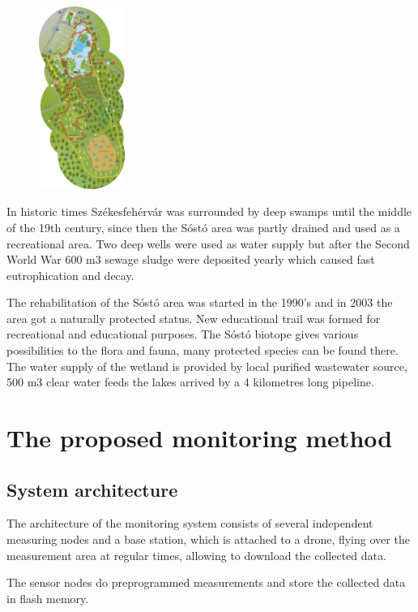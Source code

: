 \documentclass[conference]{IEEEtran}
\begin{document}
\begin{figure}[htbp]
	\centering
	\includegraphics[width=0.25\textwidth]{fig/map1.png}
  \caption{}
	\label{fig-map1}
\end{figure}

In historic times Székesfehérvár was surrounded by deep swamps until the middle
of the 19th century, since then the Sóstó area was partly drained and used as a
recreational area. Two deep wells were used as water supply but after the
Second World War 600 m3 sewage sludge were deposited yearly which caused fast
eutrophication and decay.

The rehabilitation of the Sóstó area was started in the 1990’s and in 2003 the
area got a naturally protected status. New educational trail was formed for
recreational and educational purposes. The Sóstó biotope gives various
possibilities to the flora and fauna, many protected species can be found
there. The water supply of the wetland is provided by local purified wastewater
source, 500 m3 clear water feeds the lakes arrived by a 4 kilometres long
pipeline.


\section{The proposed monitoring method}

\subsection{System architecture}

The architecture of the monitoring system consists of several independent
measuring nodes and a base station, which is attached to a drone, flying
over the measurement area at regular times, allowing to download the
collected data.

The sensor nodes do preprogrammed measurements and store the collected data
in flash memory. 
\end{document}
